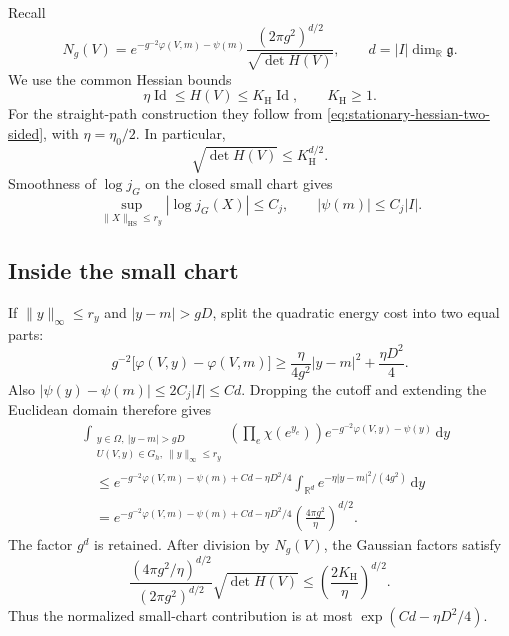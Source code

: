 \documentclass[10pt,reqno]{amsart}
\theoremstyle{definition}
\theoremstyle{remark}
\numberwithin{equation}{section}
\numberwithin{figure}{section}
\newcommand{\g}{\mathfrak g}
\newcommand{\dd}{\mathrm d}
\newcommand{\R}{\mathbb R}
\begin{document}
Recall
\begin{equation}\label{eq:all-active-Ng}
N_g(V)=e^{-g^{-2}\varphi(V,m)-\psi(m)}
\frac{(2\pi g^2)^{d/2}}{\sqrt{\det H(V)}},\qquad
d=|I|\dim_\R\g.
\end{equation}
We use the common Hessian bounds
\begin{equation}\label{eq:fine-Hessian-upper-input}
\eta\operatorname{Id}\le H(V)\le K_{\mathrm H}\operatorname{Id},
\qquad K_{\mathrm H}\ge1.
\end{equation}
For the straight-path construction they follow from
\eqref{eq:stationary-hessian-two-sided}, with $\eta=\eta_0/2$.
In particular,
\begin{equation}\label{eq:Hessian-determinant-upper-bound}
\sqrt{\det H(V)}\le K_{\mathrm H}^{d/2}.
\end{equation}
Smoothness of $\log j_G$ on the closed small chart gives
\begin{equation}\label{eq:log-j-bound}
\sup_{\|X\|_{\mathrm{HS}}\le r_y}|\log j_G(X)|\le C_j,
\qquad |\psi(m)|\le C_j|I|.
\end{equation}

\subsection{Inside the small chart}
If $\|y\|_\infty\le r_y$ and $|y-m|>gD$, split the quadratic energy
cost into two equal parts:
\begin{equation}\label{eq:good-tail-quadratic-split}
g^{-2}\bigl[\varphi(V,y)-\varphi(V,m)\bigr]
\ge\frac{\eta}{4g^2}|y-m|^2+\frac{\eta D^2}{4}.
\end{equation}
Also $|\psi(y)-\psi(m)|\le2C_j|I|\le Cd$. Dropping the cutoff and
extending the Euclidean domain therefore gives
\begin{equation}\label{eq:good-tail-small-chart-bound}
\begin{aligned}
&\int_{\substack{y\in\Omega,\ |y-m|>gD\\
 U(V,y)\in G_h,\ \|y\|_\infty\le r_y}}
\left(\prod_e\chi(e^{y_e})\right)
e^{-g^{-2}\varphi(V,y)-\psi(y)}\,\dd y\\
&\quad\le e^{-g^{-2}\varphi(V,m)-\psi(m)+Cd-\eta D^2/4}
\int_{\R^d}e^{-\eta|y-m|^2/(4g^2)}\,\dd y\\
&\quad=e^{-g^{-2}\varphi(V,m)-\psi(m)+Cd-\eta D^2/4}
\left(\frac{4\pi g^2}{\eta}\right)^{d/2}.
\end{aligned}
\end{equation}
The factor $g^d$ is retained. After division by $N_g(V)$, the
Gaussian factors satisfy
\begin{equation}\label{eq:good-tail-gaussian-factor-cancellation}
\frac{(4\pi g^2/\eta)^{d/2}}{(2\pi g^2)^{d/2}}
\sqrt{\det H(V)}
\le\left(\frac{2K_{\mathrm H}}{\eta}\right)^{d/2}.
\end{equation}
Thus the normalized small-chart contribution is at most
$\exp(Cd-\eta D^2/4)$.
\end{document}
